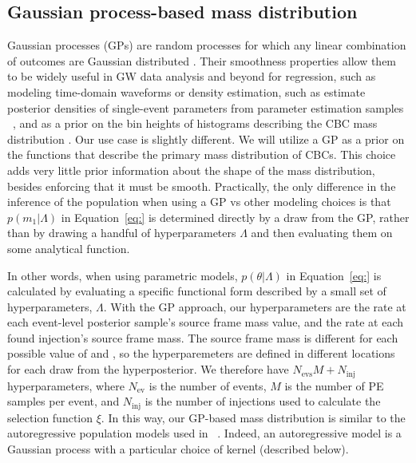 \documentclass[]{aastex631}
\begin{document}
\subsection{Gaussian process-based mass distribution}
\label{sec:model}
Gaussian processes (GPs) are random processes for which any linear combination of outcomes are Gaussian distributed \citep{rasmussen_gaussian_2006}.
Their smoothness properties allow them to be widely useful in GW data analysis and beyond for regression, such as modeling time-domain waveforms \citep{zoheyr, others} or density estimation, such as estimate posterior densities of single-event parameters from parameter estimation samples ~\citep{dangelo}, and as a prior on the bin heights of histograms describing the CBC mass distribution \citep{ray_2023}.
Our use case is slightly different.
We will utilize a GP as a prior on the functions that describe the primary mass distribution of CBCs.
This choice adds very little prior information about the shape of the mass distribution, besides enforcing that it must be smooth.
Practically, the only difference in the inference of the population when using a GP vs other modeling choices is that $p(m_1|\Lambda)$ in Equation~\ref{eq:} is determined directly by a draw from the GP, rather than by drawing a handful of hyperparameters $\Lambda$ and then evaluating them on some analytical function.

In other words, when using parametric models, $p(\theta|\Lambda)$ in Equation~\ref{eq:} is calculated by evaluating a specific functional form described by a small set of hyperparameters, $\Lambda$. 
With the GP approach, our hyperparameters are the rate at each event-level posterior sample's source frame mass value, and the rate at each found injection's source frame mass.
The source frame mass is different for each possible value of \Ho{} and \Omm{}, so the hyperparemeters are defined in different locations for each draw from the hyperposterior. %
We therefore have $N_{\text{evs}}M + N_{\text{inj}}$ hyperparameters, where $N_{\text{ev}}$ is the number of events, $M$ is the number of PE samples per event, and $N_{\text{inj}}$ is the number of injections used to calculate the selection function $\xi$.
In this way, our GP-based mass distribution is similar to the autoregressive population models used in ~\citet{callister_ar_paper}.
Indeed, an autoregressive model is a Gaussian process with a particular choice of kernel (described below). 
\end{document}
